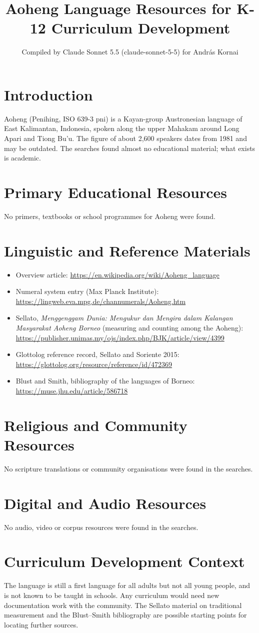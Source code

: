 \documentclass[12pt]{article}
\title{Aoheng Language Resources for K-12 Curriculum Development}
\author{Compiled by Claude Sonnet 5.5 (claude-sonnet-5-5) for Andr\'as Kornai}
\date{}
\begin{document}
\maketitle

\section{Introduction}
Aoheng (Penihing, ISO 639-3 pni) is a Kayan-group Austronesian language of East Kalimantan, Indonesia, spoken along the upper Mahakam around Long Apari and Tiong Bu'u. The figure of about 2,600 speakers dates from 1981 and may be outdated. The searches found almost no educational material; what exists is academic.

\section{Primary Educational Resources}
No primers, textbooks or school programmes for Aoheng were found.

\section{Linguistic and Reference Materials}
\begin{itemize}
\item Overview article: \url{https://en.wikipedia.org/wiki/Aoheng_language}
\item Numeral system entry (Max Planck Institute): \url{https://lingweb.eva.mpg.de/channumerals/Aoheng.htm}
\item Sellato, \emph{Menggenggam Dunia: Mengukur dan Mengira dalam Kalangan Masyarakat Aoheng Borneo} (measuring and counting among the Aoheng): \url{https://publisher.unimas.my/ojs/index.php/BJK/article/view/4399}
\item Glottolog reference record, Sellato and Soriente 2015: \url{https://glottolog.org/resource/reference/id/472369}
\item Blust and Smith, bibliography of the languages of Borneo: \url{https://muse.jhu.edu/article/586718}
\end{itemize}

\section{Religious and Community Resources}
No scripture translations or community organisations were found in the searches.

\section{Digital and Audio Resources}
No audio, video or corpus resources were found in the searches.

\section{Curriculum Development Context}
The language is still a first language for all adults but not all young people, and is not known to be taught in schools. Any curriculum would need new documentation work with the community. The Sellato material on traditional measurement and the Blust--Smith bibliography are possible starting points for locating further sources.
\end{document}
